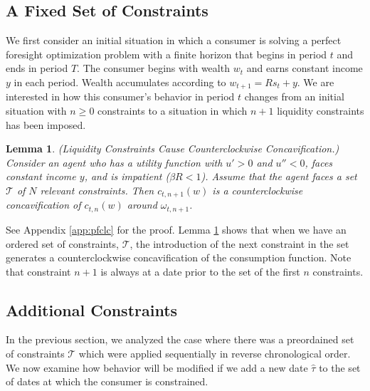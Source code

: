 \documentclass[titlepage]{\econtex}
\providecommand{\wAlt}{\omega}
\newtheorem{lemma}{Lemma}
\begin{document}
  \subsection{A Fixed Set of Constraints}\label{subsec:Piecewise}

  We first consider an initial situation in which a consumer is solving a perfect foresight optimization problem with a finite horizon that begins in period $t$ and ends in period $T$. The consumer begins with wealth $w_{t}$ and earns constant income ${y}$ in each period. Wealth accumulates according to $w_{t+1} = Rs_{t}+{y}$. We are interested in how this consumer's behavior in period $t$ changes from an initial situation with $n\geq 0$ constraints to a situation in which $n+1$ liquidity constraints has been imposed.

  \begin{lemma}\label{lem:LcAndCc}(Liquidity Constraints Cause Counterclockwise Concavification.) \\
    Consider an agent who has a utility function with $u'> 0 $ and $u'' < 0$, faces constant income ${y}$, and is impatient ($\beta R < 1$). Assume that the agent faces a set $\mathcal{T}$ of $N$ relevant constraints. Then $c_{t,n+1}(w)$ is a counterclockwise concavification of $c_{t,n}(w)$ around $\wAlt_{t,n+1}$.
  \end{lemma}

  \noindent See Appendix \ref{app:pfclc} for the proof. Lemma \ref{lem:LcAndCc} shows that when we have an ordered set of constraints, $\mathcal{T}$, the introduction of the next constraint in the set generates a counterclockwise concavification of the consumption function. Note that constraint $n+1$ is always at a date prior to the set of the first $n$ constraints. 









  \subsection{Additional Constraints}
  \label{subsec:IncreaseNumConstr}

  In the previous section, we analyzed the case where there was a preordained set of constraints $\mathcal{T}$ which were applied sequentially in reverse chronological order. We now examine how behavior will be modified if we add a new date $\hat{\tau}$ to the set of dates at which the consumer is constrained.
\end{document}
